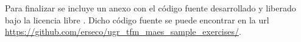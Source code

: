 \bigskip
Para finalizar se incluye un anexo con el código fuente desarrollado y liberado bajo la licencia libre \cite{gplv3}. Dicho código fuente se puede encontrar en la url \url{https://github.com/erseco/ugr_tfm_maes_sample_exercises/}.










